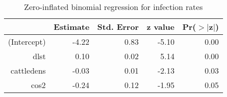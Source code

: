 \begin{table}[ht]
\centering
\caption{Zero-inflated binomial regression for infection rates} 
\label{tab:infectreg}
\begin{tabular}{rrrrr}
  \hline
 & Estimate & Std. Error & z value & Pr($>$$|$z$|$) \\ 
  \hline
(Intercept) & -4.22 & 0.83 & -5.10 & 0.00 \\ 
  dlst & 0.10 & 0.02 & 5.14 & 0.00 \\ 
  cattledens & -0.03 & 0.01 & -2.13 & 0.03 \\ 
  cos2 & -0.24 & 0.12 & -1.95 & 0.05 \\ 
   \hline
\end{tabular}
\end{table}
